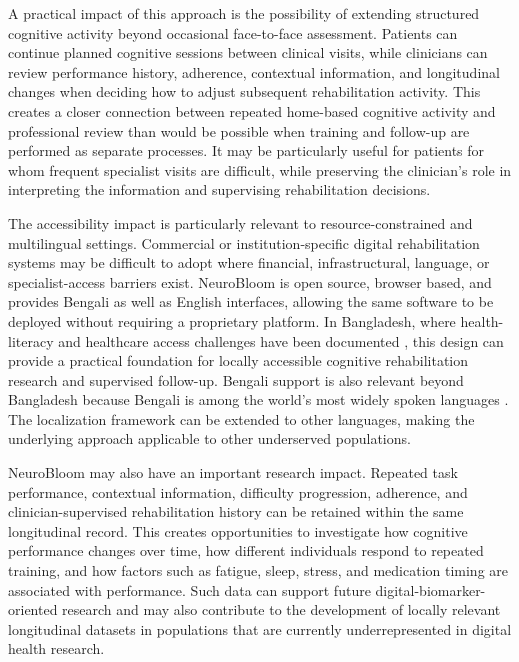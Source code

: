 \documentclass[preprint,12pt,a4paper]{elsarticle}
\begin{document}
A practical impact of this approach is the possibility of extending
structured cognitive activity beyond occasional face-to-face assessment.
Patients can continue planned cognitive sessions between clinical visits,
while clinicians can review performance history, adherence, contextual
information, and longitudinal changes when deciding how to adjust subsequent
rehabilitation activity. This creates a closer connection between repeated
home-based cognitive activity and professional review than would be possible
when training and follow-up are performed as separate processes. It may be
particularly useful for patients for whom frequent specialist visits are
difficult, while preserving the clinician's role in interpreting the
information and supervising rehabilitation decisions.

The accessibility impact is particularly relevant to resource-constrained
and multilingual settings. Commercial or institution-specific digital
rehabilitation systems may be difficult to adopt where financial,
infrastructural, language, or specialist-access barriers exist. NeuroBloom
is open source, browser based, and provides Bengali as well as English
interfaces, allowing the same software to be deployed without requiring a
proprietary platform. In Bangladesh, where health-literacy and healthcare
access challenges have been documented \cite{das2017healthliteracy}, this
design can provide a practical foundation for locally accessible cognitive
rehabilitation research and supervised follow-up. Bengali support is also
relevant beyond Bangladesh because Bengali is among the world's most widely
spoken languages \cite{ethnologue2025}. The localization framework can be
extended to other languages, making the underlying approach applicable to
other underserved populations.

NeuroBloom may also have an important research impact. Repeated task
performance, contextual information, difficulty progression, adherence, and
clinician-supervised rehabilitation history can be retained within the same
longitudinal record. This creates opportunities to investigate how cognitive
performance changes over time, how different individuals respond to repeated
training, and how factors such as fatigue, sleep, stress, and medication
timing are associated with performance. Such data can support future
digital-biomarker-oriented research \cite{insel2017,coravos2019} and may
also contribute to the development of locally relevant longitudinal
datasets in populations that are currently underrepresented in digital
health research.
\end{document}

